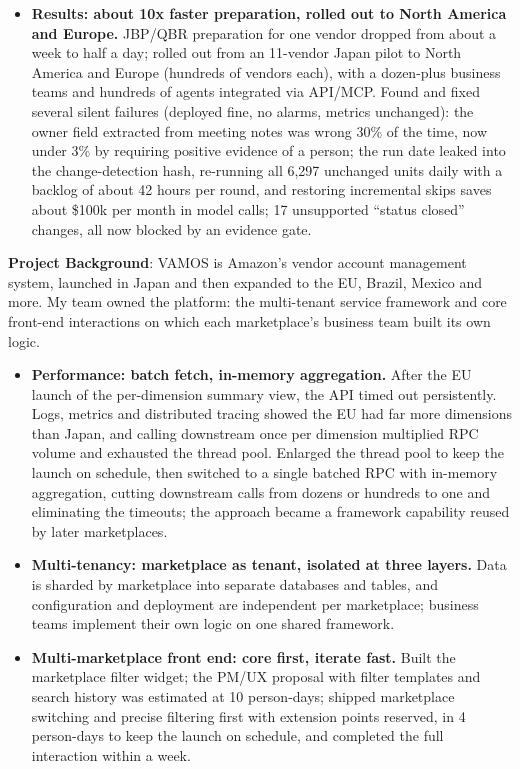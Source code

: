\documentclass{resume}
\begin{document}
\begin{itemize}
    \item \textbf{Results: about 10x faster preparation, rolled out to North America and Europe.} JBP/QBR preparation for one vendor dropped from about a week to half a day; rolled out from an 11-vendor Japan pilot to North America and Europe (hundreds of vendors each), with a dozen-plus business teams and hundreds of agents integrated via API/MCP. Found and fixed several silent failures (deployed fine, no alarms, metrics unchanged): the owner field extracted from meeting notes was wrong 30\% of the time, now under 3\% by requiring positive evidence of a person; the run date leaked into the change-detection hash, re-running all 6,297 unchanged units daily with a backlog of about 42 hours per round, and restoring incremental skips saves about \$100k per month in model calls; 17 unsupported ``status closed'' changes, all now blocked by an evidence gate.
\end{itemize}


\textbf{Project Background}: VAMOS is Amazon's vendor account management system, launched in Japan and then expanded to the EU, Brazil, Mexico and more. My team owned the platform: the multi-tenant service framework and core front-end interactions on which each marketplace's business team built its own logic.\\

\begin{itemize}
    \item \textbf{Performance: batch fetch, in-memory aggregation.} After the EU launch of the per-dimension summary view, the API timed out persistently. Logs, metrics and distributed tracing showed the EU had far more dimensions than Japan, and calling downstream once per dimension multiplied RPC volume and exhausted the thread pool. Enlarged the thread pool to keep the launch on schedule, then switched to a single batched RPC with in-memory aggregation, cutting downstream calls from dozens or hundreds to one and eliminating the timeouts; the approach became a framework capability reused by later marketplaces.
    \item \textbf{Multi-tenancy: marketplace as tenant, isolated at three layers.} Data is sharded by marketplace into separate databases and tables, and configuration and deployment are independent per marketplace; business teams implement their own logic on one shared framework.
    \item \textbf{Multi-marketplace front end: core first, iterate fast.} Built the marketplace filter widget; the PM/UX proposal with filter templates and search history was estimated at 10 person-days; shipped marketplace switching and precise filtering first with extension points reserved, in 4 person-days to keep the launch on schedule, and completed the full interaction within a week.
\end{itemize}
\end{document}
